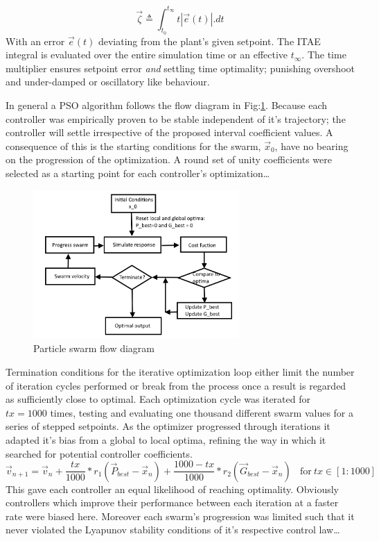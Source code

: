 \begin{equation}
\vec{\zeta}\triangleq\int_{t_0}^{t_\infty}t|\vec{e}(t)|.dt
\end{equation}
With an error $\vec{e}(t)$ deviating from the plant's given setpoint. The ITAE integral is evaluated over the entire simulation time or an effective $t_\infty$. The time multiplier ensures setpoint error \emph{and} settling time optimality; punishing overshoot and under-damped or oscillatory like behaviour.
\par
In general a PSO algorithm follows the flow diagram in Fig:\ref{fig:particle-diagram}. Because each controller was empirically proven to be stable independent of it's trajectory; the controller will settle irrespective of the proposed interval coefficient values. A consequence of this is the starting conditions for the swarm, $\vec{x}_0$, have no bearing on the progression of the optimization. A round set of unity coefficients were selected as a starting point for each controller's optimization\ldots
\begin{figure}[htbp]
\centering
\includegraphics[width=0.7\textwidth]{figs/particle-diagram}\vspace{-12pt}
\caption{Particle swarm flow diagram}
\label{fig:particle-diagram}
\vspace{-18pt}
\end{figure}
\par
Termination conditions for the iterative optimization loop either limit the number of iteration cycles performed or break from the process once a result is regarded as sufficiently close to optimal. Each optimization cycle was iterated for $tx=1000$ times, testing and evaluating one thousand different swarm values for a series of stepped setpoints. As the optimizer progressed through iterations it adapted it's bias from a global to local optima, refining the way in which it searched for potential controller coefficients.
\begin{equation}
\vec{v}_{n+1}=\vec{v}_n+\frac{tx}{1000}\ast r_1(\vec{P}_{best}-\vec{x}_n)+\frac{1000-tx}{1000}\ast r_2(\vec{G}_{best}-\vec{x}_n)~~~~\text{for}~tx\in[1:1000]
\end{equation}
This gave each controller an equal likelihood of reaching optimality. Obviously controllers which improve their performance between each iteration at a faster rate were biased here. Moreover each swarm's progression was limited such that it never violated the Lyapunov stability conditions of it's respective control law\ldots
